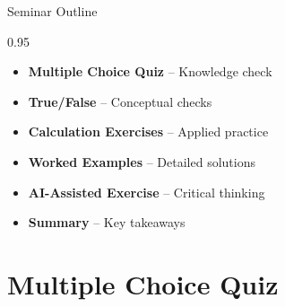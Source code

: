 \documentclass[9pt, aspectratio=169, t]{beamer}
\subtitle{Seminar 9: Prophet and TBATS}
\begin{document}
{
\begin{frame}
    \titlepage
\end{frame}
}


\begin{frame}{Seminar Outline}
    \begin{cminipage}{0.95\textwidth}
    \begin{itemize}
        \item \textbf{Multiple Choice Quiz} -- Knowledge check
        \vspace{0.15cm}
        \item \textbf{True/False} -- Conceptual checks
        \vspace{0.15cm}
        \item \textbf{Calculation Exercises} -- Applied practice
        \vspace{0.15cm}
        \item \textbf{Worked Examples} -- Detailed solutions
        \vspace{0.15cm}
        \item \textbf{AI-Assisted Exercise} -- Critical thinking
        \vspace{0.15cm}
        \item \textbf{Summary} -- Key takeaways
    \end{itemize}
    \end{cminipage}
\end{frame}

\section{Multiple Choice Quiz}
\end{document}
